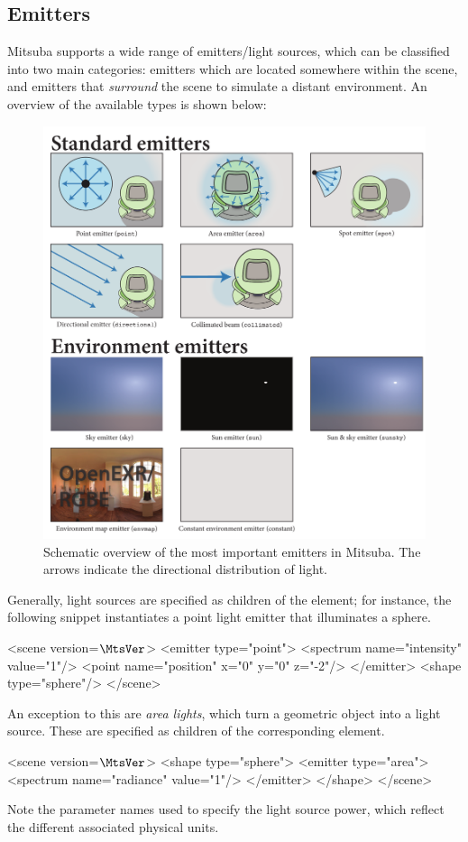 \newpage
\subsection{Emitters}
\label{sec:emitters}
Mitsuba supports a wide range of emitters/light sources, which can be classified
into two main categories: emitters which are located somewhere within the scene, and emitters
that \emph{surround} the scene to simulate a distant environment. An overview of the available
types is shown below:
\begin{figure}[h!]
\centering
\includegraphics[width=15.5cm]{images/emitter_overview.pdf}
\caption{
    Schematic overview of the most important emitters in Mitsuba.
    The arrows indicate the directional distribution of light.
}
\end{figure}
\newpage
Generally, light sources are specified as children of the  element; for instance,
the following snippet instantiates a point light emitter that illuminates a sphere.
\begin{xml}
<scene version=$\MtsVer$>
	<emitter type="point">
		<spectrum name="intensity" value="1"/>
		<point name="position" x="0" y="0" z="-2"/>
	</emitter>
	<shape type="sphere"/>
</scene>
\end{xml}
An exception to this are \emph{area lights}, which turn a geometric object into a light source.
These are specified as children of the corresponding  element.
\begin{xml}
<scene version=$\MtsVer$>
	<shape type="sphere">
		<emitter type="area">
			<spectrum name="radiance" value="1"/>
		</emitter>
	</shape>
</scene>
\end{xml}
Note the parameter names used to specify the light source power, which reflect
the different associated physical units.
